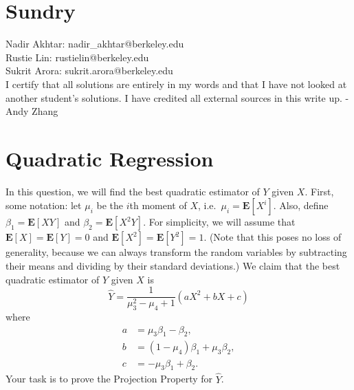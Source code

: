 \documentclass[11pt]{article}
\newcommand*{\Question}[1]{\section{#1}}
\newcommand*{\E}{\textbf{E}}
\begin{document}
\Question{Sundry} 
\vspace{10pt}
\noindent Nadir Akhtar: nadir\_akhtar@berkeley.edu\\
Rustie Lin: rustielin@berkeley.edu\\
Sukrit Arora: sukrit.arora@berkeley.edu\\

I certify that all solutions are entirely in my words and that I have not looked at another student’s
solutions. I have credited all external sources in this write up. - Andy Zhang
\vfill\pagebreak[3]

\Question{Quadratic Regression}

In this question, we will find the best quadratic estimator of $Y$ given $X$. First, some notation: let $\mu_i$ be the $i$th moment of $X$, i.e.\ $\mu_i = \E[X^i]$. Also, define $\beta_1 = \E[XY]$ and $\beta_2 = \E[X^2 Y]$. For simplicity, we will assume that $\E[X] = \E[Y] = 0$ and $\E[X^2] = \E[Y^2] = 1$. (Note that this poses no loss of generality, because we can always transform the random variables by subtracting their means and dividing by their standard deviations.) We claim that the best quadratic estimator of $Y$ given $X$ is
\[
  \hat{Y} = \frac{1}{\mu_3^2 - \mu_4 + 1} (a X^2 + b X + c)
\]
where
\begin{align*}
  a &= \mu_3 \beta_1 - \beta_2, \\
  b &= (1 - \mu_4) \beta_1 + \mu_3 \beta_2, \\
  c &= -\mu_3 \beta_1 + \beta_2.
\end{align*}
Your task is to prove the Projection Property for $\hat{Y}$.
\end{document}
